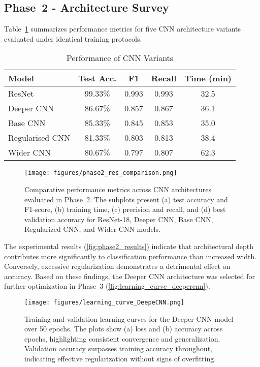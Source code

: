 
\subsection{Phase~2 - Architecture Survey}

\noindent
Table~\ref{tab:variants} summarizes performance metrics for five CNN architecture variants evaluated under identical training protocols.\\

\begin{table}[htbp]
\caption{\small Performance of CNN Variants}
\label{tab:variants}
\centering
\begin{tabular}{lcccc}
\toprule
Model & Test Acc. & F1 & Recall & Time (min) \\
\midrule
ResNet\textendash18 & 99.33\% & 0.993 & 0.993 & 32.5 \\
Deeper CNN & 86.67\% & 0.857 & 0.867 & 36.1 \\
Base CNN & 85.33\% & 0.845 & 0.853 & 35.0 \\
Regularised CNN & 81.33\% & 0.803 & 0.813 & 38.4 \\
Wider CNN & 80.67\% & 0.797 & 0.807 & 62.3 \\
\bottomrule
\end{tabular}
\end{table}

\begin{figure}[htbp]
    \centering
    \texttt{[image: figures/phase2\_res\_comparison.png]}
    \caption{\small Comparative performance metrics across CNN architectures evaluated in Phase~2. The subplots present (a) test accuracy and F1-score, (b) training time, (c) precision and recall, and (d) best validation accuracy for ResNet-18, Deeper CNN, Base CNN, Regularized CNN, and Wider CNN models.}
    \label{fig:phase2_results}
\end{figure}


\noindent
The experimental results (\autoref{fig:phase2_results}) indicate that architectural depth contributes more significantly to classification performance than increased width. Conversely, excessive regularization demonstrates a detrimental effect on accuracy. Based on these findings, the Deeper CNN architecture was selected for further optimization in Phase~3 (\autoref{fig:learning_curve_deepercnn}).

\begin{figure}[htbp]
    \centering
    \texttt{[image: figures/learning\_curve\_DeepeCNN.png]}
    \caption{\small Training and validation learning curves for the Deeper CNN model over 50 epochs. The plots show (a) loss and (b) accuracy across epochs, highlighting consistent convergence and generalization. Validation accuracy surpasses training accuracy throughout, indicating effective regularization without signs of overfitting.}
    \label{fig:learning_curve_deepercnn}
\end{figure}

